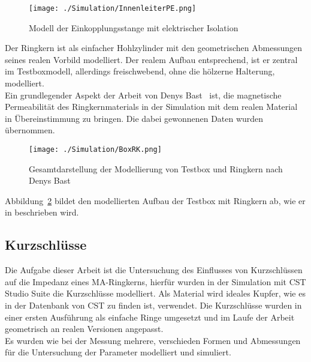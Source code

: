             \begin{figure}[htb]
                \centering
                \texttt{[image: ./Simulation/InnenleiterPE.png]}
                \caption{Modell der Einkopplungsstange mit elektrischer Isolation}
                \label{fig:InnenleiterCST}
            \end{figure}
        
        Der Ringkern ist als einfacher Hohlzylinder mit den geometrischen Abmessungen seines realen Vorbild modelliert. Der realem Aufbau entsprechend, ist er zentral im Testboxmodell, allerdings freischwebend, ohne die hölzerne Halterung, modelliert.\\
        Ein grundlegender Aspekt der Arbeit von Denys Bast~\cite{bast2017ba} ist, die magnetische Permeabilität des Ringkernmaterials in der Simulation mit dem realen Material in Übereinstimmung zu bringen. Die dabei gewonnenen Daten wurden übernommen.
        
            \begin{figure}[htb]
                \centering
                \texttt{[image: ./Simulation/BoxRK.png]}
                \caption{Gesamtdarstellung der Modellierung von Testbox und Ringkern nach Denys Bast~\cite{bast2017ba}}
                \label{fig:BoxRKCST}
            \end{figure}
        
        Abbildung~\ref{fig:BoxRKCST} bildet den modellierten Aufbau der Testbox mit Ringkern ab, wie er in \cite{bast2017ba} beschrieben wird.

        \subsection{Kurzschlüsse}
        Die Aufgabe dieser Arbeit ist die Untersuchung des Einflusses von Kurzschlüssen auf die Impedanz eines MA-Ringkerns, hierfür wurden in der Simulation mit CST Studio Suite die Kurzschlüsse modelliert. Als Material wird ideales Kupfer, wie es in der Datenbank von CST zu finden ist, verwendet. Die Kurzschlüsse wurden in einer ersten Ausführung als einfache Ringe umgesetzt und im Laufe der Arbeit geometrisch an realen Versionen angepasst.\\
        Es wurden wie bei der Messung mehrere, verschieden Formen und Abmessungen für die Untersuchung der Parameter modelliert und simuliert.
        
